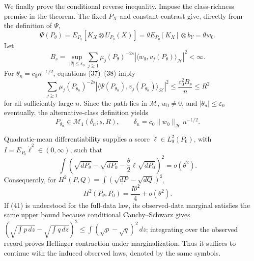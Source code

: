 We finally prove the conditional reverse inequality.  Impose the class-richness premise in the theorem.  The fixed \(P_X\) and constant contrast give, directly from the definition of \(\Psi\),
\[
 \Psi(P_\theta)
 =E_{P_\theta}[K_X\otimes U_{P_\theta}(X)]
 =\theta E_{P_0}[K_X]\otimes b_Y
 =\theta w_0.
 \tag{37}
\]
Let
\[
 B_s=\sup_{|\theta|\leq\varepsilon_0}
 \sum_{j\geq1}\mu_j(P_\theta)^{-2s}
 |\langle w_0,v_j(P_\theta)\rangle_{\mathcal H}|^2<\infty.
 \tag{38}
\]
For \(\theta_n=c_0n^{-1/2}\), equations (37)--(38) imply
\[
 \sum_{j\geq1}\mu_j(P_{\theta_n})^{-2s}
 |\langle\Psi(P_{\theta_n}),v_j(P_{\theta_n})\rangle_{\mathcal H}|^2
 \leq\frac{c_0^2B_s}{n}\leq R^2
 \tag{39}
\]
for all sufficiently large \(n\).  Since the path lies in \(\mathcal M\), \(w_0\ne0\), and \(|\theta_n|\leq\varepsilon_0\) eventually, the alternative-class definition yields
\[
 P_{\theta_n}\in\mathcal M_1(\delta_n;s,R),
 \qquad
 \delta_n=c_0\|w_0\|_{\mathcal H}n^{-1/2}.
 \tag{40}
\]

Quadratic-mean differentiability supplies a score \(\dot\ell\in L^2_0(P_0)\), with \(I=E_{P_0}\dot\ell^2\in(0,\infty)\), such that
\[
 \int\left(
  \sqrt{dP_\theta}-\sqrt{dP_0}
  -\frac{\theta}{2}\dot\ell\sqrt{dP_0}
 \right)^2=o(\theta^2).
 \tag{41}
\]
Consequently, for \(H^2(P,Q)=\int(\sqrt{dP}-\sqrt{dQ})^2\),
\[
 H^2(P_\theta,P_0)=\frac{I\theta^2}{4}+o(\theta^2).
 \tag{42}
\]
If (41) is understood for the full-data law, its observed-data marginal satisfies the same upper bound because conditional Cauchy--Schwarz gives
\(
 (\sqrt{\int p\,dz}-\sqrt{\int q\,dz})^2
 \leq\int(\sqrt p-\sqrt q)^2\,dz
\); integrating over the observed record proves Hellinger contraction under marginalization.  Thus it suffices to continue with the induced observed laws, denoted by the same symbols.

